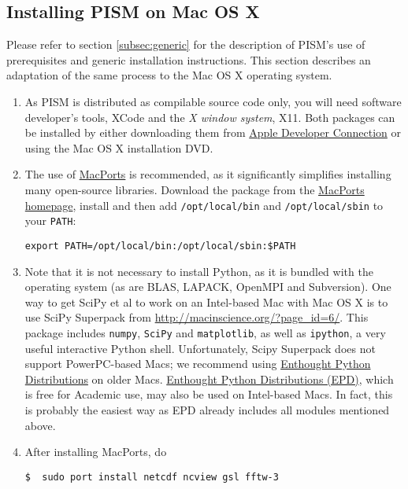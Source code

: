 \documentclass[11pt,final]{amsart}
\begin{document}
\clearpage
\subsection{Installing PISM on Mac OS X}  \label{subsec:macosx}

Please refer to section \ref{subsec:generic} for the description of PISM's use of prerequisites and generic installation
instructions. This section describes an adaptation of the same process to the Mac OS X operating system.

\begin{enumerate}
\item As PISM is distributed as compilable source code only, you will need software developer's tools, XCode and the \emph{X
    window system}, X11. Both packages can be installed by either downloading them from
  \href{http://developer.apple.com/tools/xcode/}{Apple Developer Connection} or using the Mac OS X installation DVD.
\item The use of \href{http://www.macports.org/}{MacPorts} is recommended, as it significantly simplifies installing many
  open-source libraries. Download the package from the \href{http://www.macports.org/install.php}{MacPorts homepage}, install and
  then add \texttt{/opt/local/bin} and \texttt{/opt/local/sbin} to your \texttt{PATH}:
\begin{verbatim}
export PATH=/opt/local/bin:/opt/local/sbin:$PATH
\end{verbatim}
\item Note that it is not necessary to install Python, as it is bundled with the operating system (as are BLAS, LAPACK, OpenMPI and
  Subversion). One way to get SciPy et al to work on an Intel-based Mac with Mac OS X is to use SciPy Superpack from
  \url{http://macinscience.org/?page_id=6/}. This package includes \texttt{numpy}, \texttt{SciPy} and \texttt{matplotlib}, as well as \texttt{ipython}, a very useful
  interactive Python shell. Unfortunately, Scipy Superpack does not support PowerPC-based Macs; we recommend using \href{http://www.enthought.com/}{Enthought Python Distributions} on older Macs. \href{http://www.enthought.com/}{Enthought Python Distributions (EPD)}, which is free for Academic use, may also be used on Intel-based Macs. In fact, this is probably the easiest way as EPD already includes all modules mentioned above.
\item After installing MacPorts, do
\begin{verbatim}
$  sudo port install netcdf ncview gsl fftw-3
\end{verbatim}

\end{enumerate}
\end{document}
